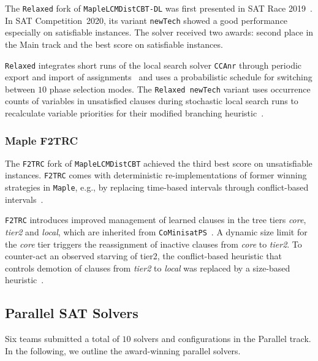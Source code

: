 \documentclass{elsarticle}
\newcommand{\solver}[1]{\texttt{#1}}
\begin{document}
The \solver{Relaxed} fork of \solver{MapleLCMDistCBT-DL} was first presented in SAT Race 2019~\cite{Xindi:SC2019}. 
In SAT Competition~2020, its variant \solver{newTech} showed a good performance especially on satisfiable instances. 
The solver received two awards: second place in the Main track and the best score on satisfiable instances. 

\solver{Relaxed} integrates short runs of the local search solver \solver{CCAnr} through periodic export and import of assignments~\cite{Xindi:SC2019} and uses a probabilistic schedule for switching between $10$ phase selection modes. 
The \solver{Relaxed newTech} variant uses occurrence counts of variables in unsatisfied clauses during stochastic local search runs to recalculate variable priorities for their modified branching heuristic~\cite{Xindi:SC2020}. 


\subsubsection{Maple F2TRC}

The \solver{F2TRC} fork of \solver{MapleLCMDistCBT} achieved the third best score on unsatisfiable instances. 
\solver{F2TRC} comes with deterministic re-implementations of former winning strategies in \solver{Maple}, e.g., by replacing time-based intervals through conflict-based intervals~\cite{Kochemazov:SC2020}. 

\solver{F2TRC} introduces improved management of learned clauses in the tree tiers \emph{core}, \emph{tier2} and \emph{local}, which are inherited from \solver{CoMinisatPS}~\cite{Oh:2015:satunsat}.
A dynamic size limit for the \emph{core} tier triggers the reassignment of inactive clauses from \emph{core} to \emph{tier2}. 
To counter-act an observed starving of tier2, the conflict-based heuristic that controls demotion of clauses from \emph{tier2} to \emph{local} was replaced by a size-based heuristic~\cite{Kochemazov:SC2020}. 


\subsection{Parallel SAT Solvers}
\label{sec:part:par}

Six teams submitted a total of $10$ solvers and configurations in the Parallel track. 
In the following, we outline the award-winning parallel solvers. 
\end{document}
